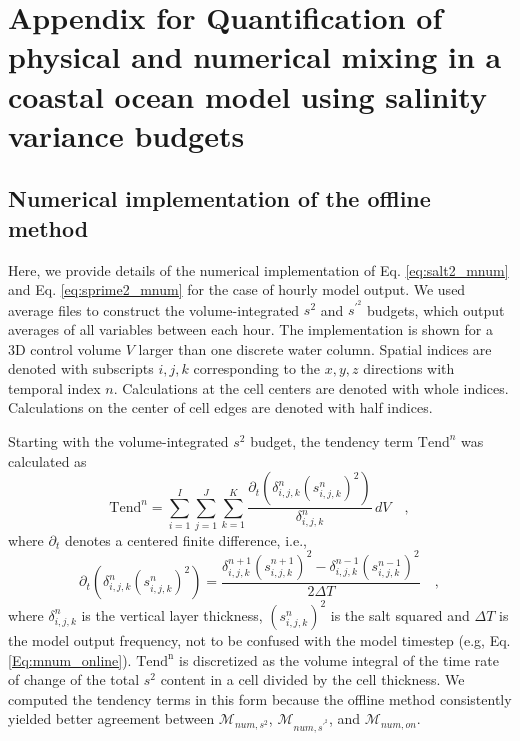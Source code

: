 

\chapter{Appendix for Quantification of physical and numerical mixing in a coastal ocean model using salinity variance budgets}%

\section{Numerical implementation of the offline method} \label{Appendix:offline_method}

Here, we provide details of the numerical implementation of Eq. \ref{eq:salt2_mnum} and Eq. \ref{eq:sprime2_mnum} for the case of hourly model output. We used average files to construct the volume-integrated $s^2$ and $s^{\prime^2}$ budgets, which output averages of all variables between each hour. The implementation is shown for a 3D control volume $V$ larger than one discrete water column. Spatial indices are denoted with subscripts $i,j,k$ corresponding to the $x,y,z$ directions with temporal index $n$. Calculations at the cell centers are denoted with whole indices. Calculations on the center of cell edges are denoted with half indices. 

Starting with the volume-integrated $s^2$ budget, the tendency term $\mathrm{Tend}^n$ was calculated as
\begin{equation} \label{eq:append_tend}
        \mathrm{Tend}^n = \sum_{i=1}^{I}\sum_{j=1}^{J}\sum_{k=1}^{K} \frac{\partial_t \left(\delta_{i,j,k}^n \left(s_{i,j,k}^{n} \right)^2 \right)}{\delta_{i,j,k}^n} \, dV \quad ,
\end{equation}
where $\partial_t$ denotes a centered finite difference, i.e., 
\begin{equation} \label{eq:append_finitediff}
        \partial_t \left(\delta_{i,j,k}^n \left(s_{i,j,k}^{n} \right)^2 \right) = \frac{\delta_{i,j,k}^{n+1} \left(s_{i,j,k}^{n+1} \right)^2-\delta_{i,j,k}^{n-1} \left(s_{i,j,k}^{n-1} \right)^2}{2 \Delta T} \quad ,
\end{equation}
where $\delta_{i,j,k}^n$ is the vertical layer thickness, $(s_{i,j,k}^{n})^2$ is the salt squared and $\Delta T$ is the model output frequency, not to be confused with the model timestep (e.g, Eq. \ref{Eq:mnum_online}). $\mathrm{Tend^n}$ is discretized as the volume integral of the time rate of change of the total $s^2$ content in a cell divided by the cell thickness. We computed the tendency terms in this form because the offline method consistently yielded better agreement between $\mathcal{M}_{num,s^2}$, $\mathcal{M}_{num,s^{\prime^2}}$, and $\mathcal{M}_{num,on}$. 

